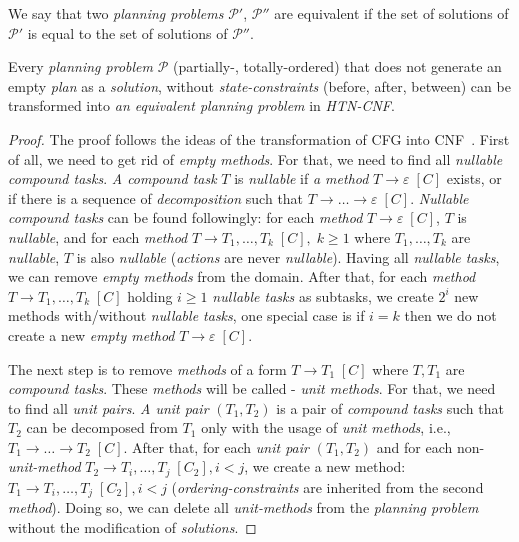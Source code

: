\begin{defn}\label{def04:15}
    We say that two \emph{planning problems} $\mathcal{P'}$, $\mathcal{P''}$ are equivalent if the set of solutions of $\mathcal{P'}$ is equal to the set of solutions of $\mathcal{P''}$.
\end{defn}

\begin{thm}\label{thm04:5}
    Every \emph{planning problem} $\mathcal{P}$ (partially-, totally-ordered) that does not generate an empty \emph{plan} as a \emph{solution}, without \emph{state-constraints} (before, after, between) can be transformed into \emph{an equivalent planning problem} in \emph{HTN-CNF}.
\end{thm}
\begin{proof}
    The proof follows the ideas of the transformation of CFG into CNF~\cite{chytil}. First of all, we need to get rid of \emph{empty methods}. For that, we need to find all \emph{nullable compound tasks}. \emph{A compound task} $T$ is \emph{nullable} if \emph{a method} $T \rightarrow \varepsilon \; [C]$ exists, or if there is a sequence of \emph{decomposition} such that $T \rightarrow \dots \rightarrow \varepsilon \; [C]$. \emph{Nullable compound tasks} can be found followingly: for each \emph{method} $T \rightarrow \varepsilon \; [C]$, $T$ is \emph{nullable}, and for each \emph{method} $T \rightarrow T_1, \dots, T_k \; [C], \; k \geq 1$ where $T_1, \dots, T_k$ are \emph{nullable}, $T$ is also \emph{nullable} (\emph{actions} are never \emph{nullable}). Having all \emph{nullable tasks}, we can remove \emph{empty methods} from the domain. After that, for each \emph{method} $T \rightarrow T_1, \dots, T_k \; [C]$ holding $i \geq 1$ \emph{nullable tasks} as subtasks, we create $2^i$ new methods with/without \emph{nullable tasks}, one special case is if $i = k$ then we do not create a new \emph{empty method} $T \rightarrow \varepsilon \; [C]$. 
    
    The next step is to remove \emph{methods} of a form $T \rightarrow T_1 \; [C]$ where $T, T_1$ are \emph{compound tasks}. These \emph{methods} will be called - \emph{unit methods}. For that, we need to find all \emph{unit pairs}. \emph{A unit pair} $(T_1, T_2)$ is a pair of \emph{compound tasks} such that $T_2$ can be decomposed from $T_1$ only with the usage of \emph{unit methods}, i.e., $T_1 \rightarrow \dots \rightarrow T_2 \; [C]$. After that, for each \emph{unit pair} $(T_1, T_2)$ and for each non-\emph{unit-method} $T_2 \rightarrow T_i, \dots, T_j \; [C_2], i < j$, we create a new method: $T_1 \rightarrow T_i, \dots, T_j \; [C_2], i < j$ (\emph{ordering-constraints} are inherited from the second \emph{method}). Doing so, we can delete all \emph{unit-methods} from the \emph{planning problem} without the modification of \emph{solutions}.


\end{proof}
